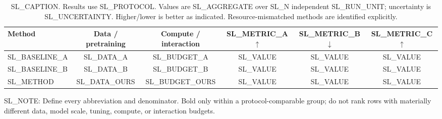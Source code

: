 \begin{table}[t]
  \centering
  \small
  \caption{SL_CAPTION. Results use SL_PROTOCOL. Values are SL_AGGREGATE over
  SL_N independent SL_RUN_UNIT; uncertainty is SL_UNCERTAINTY. Higher/lower is
  better as indicated. Resource-mismatched methods are identified explicitly.}
  \label{tab:SL_LABEL}
  \begin{tabular}{lccccc}
    \toprule
    Method & Data / pretraining & Compute / interaction & SL_METRIC_A $\uparrow$ &
    SL_METRIC_B $\downarrow$ & SL_METRIC_C $\uparrow$ \\
    \midrule
    SL_BASELINE_A & SL_DATA_A & SL_BUDGET_A & SL_VALUE & SL_VALUE & SL_VALUE \\
    SL_BASELINE_B & SL_DATA_B & SL_BUDGET_B & SL_VALUE & SL_VALUE & SL_VALUE \\
    \midrule
    SL_METHOD & SL_DATA_OURS & SL_BUDGET_OURS & SL_VALUE & SL_VALUE & SL_VALUE \\
    \bottomrule
  \end{tabular}
  \vspace{2pt}

  \parbox{0.98\linewidth}{\footnotesize
  SL_NOTE: Define every abbreviation and denominator. Bold only within a
  protocol-comparable group; do not rank rows with materially different data,
  model scale, tuning, compute, or interaction budgets.}
\end{table}
